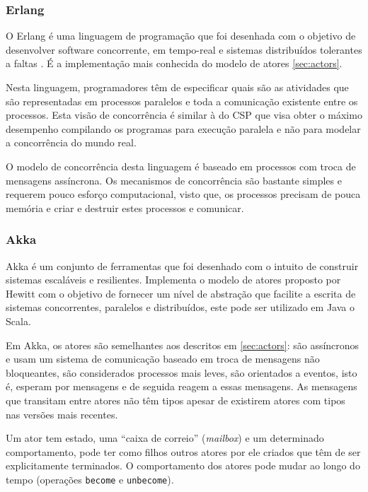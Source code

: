 \subsubsection{Erlang}
O Erlang é uma linguagem de programação que foi desenhada com o objetivo de desenvolver software concorrente, em tempo-real e sistemas distribuídos tolerantes a faltas \cite{Armstrong:ErlangBook}. É a implementação mais conhecida do modelo de atores \ref{sec:actors}.

Nesta linguagem, programadores têm de especificar quais são as atividades que são representadas em processos paralelos e toda a comunicação existente entre os processos. Esta visão de concorrência é similar à do CSP \cite{Hoare:CSP} que visa obter o máximo desempenho compilando os programas para execução paralela e não para modelar a concorrência do mundo real.

O modelo de concorrência desta linguagem é baseado em processos com troca de mensagens assíncrona. Os mecanismos de concorrência são bastante simples e requerem pouco esforço computacional, visto que, os processos precisam de pouca memória e criar e destruir estes processos e comunicar.

\subsubsection{Akka}

Akka é um conjunto de ferramentas que foi desenhado com o intuito de construir sistemas escaláveis e resilientes.
Implementa o modelo de atores proposto por Hewitt  \cite{Hewitt:ActorFormalismForAI} com o objetivo de fornecer um nível de abstração que facilite a escrita de sistemas concorrentes, paralelos e distribuídos, este pode ser utilizado em Java o Scala.

Em Akka, os atores são semelhantes aos descritos em \ref{sec:actors}: são assíncronos e usam um sistema de comunicação baseado em troca de mensagens não bloqueantes, são considerados processos mais leves, são orientados a eventos, isto é, esperam por mensagens e de seguida reagem a essas mensagens. As mensagens que transitam entre atores não têm tipos apesar de existirem atores com tipos nas versões mais recentes.

Um ator tem estado, uma ``caixa de correio'' (\textit{mailbox}) e um determinado comportamento, pode ter como filhos outros atores por ele criados que têm de ser explicitamente terminados. O comportamento dos atores pode mudar ao longo do tempo (operações \lstinline"become" e \lstinline"unbecome").

